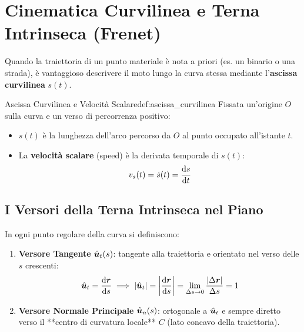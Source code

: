 \section{Cinematica Curvilinea e Terna Intrinseca (Frenet)}
\label{sec:terna_intrinseca}

Quando la traiettoria di un punto materiale è nota a priori (es. un binario o una strada), è vantaggioso descrivere il moto lungo la curva stessa mediante l'\textbf{ascissa curvilinea} $s(t)$.

\begin{definizione}{Ascissa Curvilinea e Velocità Scalare}{def:ascissa_curvilinea}
Fissata un'origine $O$ sulla curva e un verso di percorrenza positivo:
\begin{itemize}
    \item $s(t)$ è la lunghezza dell'arco percorso da $O$ al punto occupato all'istante $t$.
    \item La \textbf{velocità scalare} (speed) è la derivata temporale di $s(t)$:
    \begin{equation}
        v_s(t) = \dot{s}(t) = \frac{\mathrm{d} s}{\mathrm{d} t}
    \end{equation}
\end{itemize}
\end{definizione}

\subsection{I Versori della Terna Intrinseca nel Piano}
In ogni punto regolare della curva si definiscono:
\begin{enumerate}
    \item \textbf{Versore Tangente} $\hat{\bm{u}}_t(s)$: tangente alla traiettoria e orientato nel verso delle $s$ crescenti:
    \begin{equation}
        \hat{\bm{u}}_t = \frac{\mathrm{d} \bm{r}}{\mathrm{d} s} \implies |\hat{\bm{u}}_t| = \left|\frac{\mathrm{d} \bm{r}}{\mathrm{d} s}\right| = \lim_{\Delta s \to 0} \frac{|\Delta\bm{r}|}{\Delta s} = 1
    \end{equation}
    \item \textbf{Versore Normale Principale} $\hat{\bm{u}}_n(s)$: ortogonale a $\hat{\bm{u}}_t$ e sempre diretto verso il **centro di curvatura locale** $C$ (lato concavo della traiettoria).
\end{enumerate}

